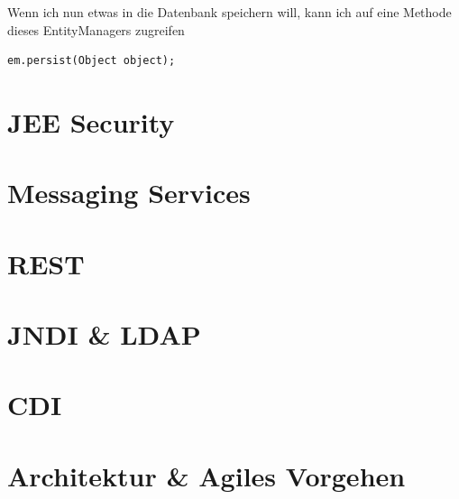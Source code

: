 \documentclass[a4paper, 11pt]{article}
\begin{document}
Wenn ich nun etwas in die Datenbank speichern will, kann ich auf eine Methode dieses EntityManagers zugreifen

\begin{lstlisting}
em.persist(Object object);
\end{lstlisting}

\section{JEE Security}

\section{Messaging Services}

\section{REST}

\section{JNDI \& LDAP}

\section{CDI}

\section{Architektur \& Agiles Vorgehen}
\end{document}

